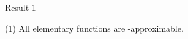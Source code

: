 \begin{frame}{Result 1}
    \pause
    \begin{ntheorem}(1)
        All elementary functions are \WhileCC-approximable.
    \end{ntheorem}
\end{frame}